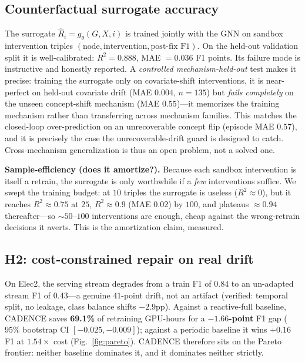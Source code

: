 \documentclass[conference]{IEEEtran}
\begin{document}
\subsection{Counterfactual surrogate accuracy}\label{sec:surrogate}
The surrogate $\hat R_i=g_\theta(G,X,i)$ is trained jointly with the GNN on
sandbox intervention triples $(\text{node},\text{intervention},\text{post-fix F1})$.
On the held-out validation split it is well-calibrated:
$R^2=0.888$, MAE $=0.036$ F1 points. Its
failure mode is instructive and honestly reported. A \emph{controlled
mechanism-held-out} test makes it precise: training the surrogate only on
covariate-shift interventions, it is near-perfect on held-out covariate
drift (MAE $0.004$, $n{=}135$) but \emph{fails completely} on the unseen
concept-shift mechanism (MAE $0.55$)---it memorizes the training mechanism
rather than transferring across mechanism families. This matches the
closed-loop over-prediction on an unrecoverable concept flip (episode MAE
$0.57$), and it is precisely the case the unrecoverable-drift guard is
designed to catch. Cross-mechanism generalization is thus an open problem,
not a solved one.

\textbf{Sample-efficiency (does it amortize?).} Because each sandbox
intervention is itself a retrain, the surrogate is only worthwhile if a
\emph{few} interventions suffice. We swept the training budget: at $10$
triples the surrogate is useless ($R^2\!\approx\!0$), but it reaches
$R^2\!\approx\!0.75$ at $25$, $R^2\!\approx\!0.9$ (MAE $0.02$) by $100$, and
plateaus $\approx0.94$ thereafter---so $\sim\!50$--$100$ interventions are
enough, cheap against the wrong-retrain decisions it averts. This is the
amortization claim, measured.

\subsection{H2: cost-constrained repair on real drift}\label{sec:h2}
On Elec2, the serving stream degrades from a train F1 of $0.84$ to an
un-adapted stream F1 of $0.43$---a genuine $41$-point drift, not an
artifact (verified: temporal split, no leakage, class balance shifts
$-2.9$pp). Against a reactive-full baseline, CADENCE saves \textbf{69.1\%}
of retraining GPU-hours for a \textbf{$-1.66$-point} F1 gap ($95\%$
bootstrap CI $[-0.025,-0.009]$); against a periodic baseline it wins
$+0.16$ F1 at $1.54\times$ cost (Fig.~\ref{fig:pareto}). CADENCE therefore
sits on the Pareto frontier: neither baseline dominates it, and it
dominates neither strictly.
\end{document}
